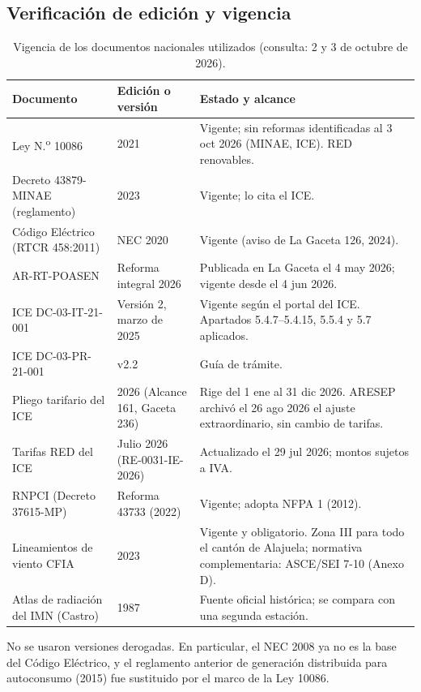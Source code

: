 \documentclass[12pt]{article}
\begin{document}
\subsection{Verificación de edición y vigencia}
\begin{table}[H]
\centering\small
\caption{Vigencia de los documentos nacionales utilizados (consulta: 2 y 3 de octubre de 2026).}\label{tab:vigencia}
\begin{tabularx}{\textwidth}{L{5.2cm}L{3.6cm}Y}
\toprule
\textbf{Documento} & \textbf{Edición o versión} & \textbf{Estado y alcance}\\
\midrule
Ley N.\textsuperscript{o} 10086 & 2021 & Vigente; sin reformas identificadas al 3 oct 2026 (MINAE, ICE). RED renovables.\\
Decreto 43879-MINAE (reglamento) & 2023 & Vigente; lo cita el ICE.\\
Código Eléctrico (RTCR 458:2011) & NEC 2020 & Vigente (aviso de La Gaceta 126, 2024).\\
AR-RT-POASEN & Reforma integral 2026 & Publicada en La Gaceta el 4 may 2026; vigente desde el 4 jun 2026.\\
ICE DC-03-IT-21-001 & Versión 2, marzo de 2025 & Vigente según el portal del ICE. Apartados 5.4.7--5.4.15, 5.5.4 y 5.7 aplicados.\\
ICE DC-03-PR-21-001 & v2.2 & Guía de trámite.\\
Pliego tarifario del ICE & 2026 (Alcance 161, Gaceta 236) & Rige del 1 ene al 31 dic 2026. ARESEP archivó el 26 ago 2026 el ajuste extraordinario, sin cambio de tarifas.\\
Tarifas RED del ICE & Julio 2026 (RE-0031-IE-2026) & Actualizado el 29 jul 2026; montos sujetos a IVA.\\
RNPCI (Decreto 37615-MP) & Reforma 43733 (2022) & Vigente; adopta NFPA 1 (2012).\\
Lineamientos de viento CFIA & 2023 & Vigente y obligatorio. Zona III para todo el cantón de Alajuela; normativa complementaria: ASCE/SEI 7-10 (Anexo D).\\
Atlas de radiación del IMN (Castro) & 1987 & Fuente oficial histórica; se compara con una segunda estación.\\
\bottomrule
\end{tabularx}
\end{table}
No se usaron versiones derogadas. En particular, el NEC 2008 ya no es la base del Código Eléctrico, y el reglamento anterior de generación distribuida para autoconsumo (2015) fue sustituido por el marco de la Ley 10086.
\end{document}
